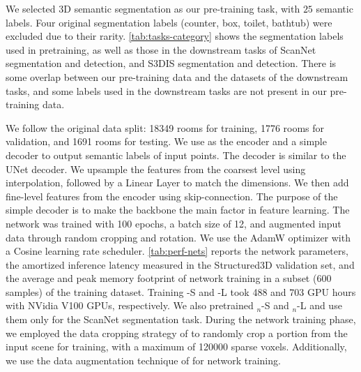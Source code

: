 \documentclass[10pt,twocolumn,letterpaper]{article}
\begin{document}
 We selected 3D semantic segmentation as our pre-training task, with $25$ semantic labels. Four original segmentation labels (counter, box, toilet, bathtub) were excluded due to their rarity. \cref{tab:tasks-category} shows the segmentation labels used in pretraining, as well as those in the downstream tasks of ScanNet segmentation and detection, and S3DIS segmentation and detection. There is some overlap between our pre-training data and the datasets of the downstream tasks, and some labels used in the downstream tasks are not present in our pre-training data.

We follow the original data split: 18349 rooms for training, 1776 rooms for validation, and 1691 rooms for testing. We use {\SST} as the encoder and a simple decoder to output semantic labels of input points. The decoder is similar to the UNet decoder. We upsample the features from the coarsest level using interpolation, followed by a Linear Layer to match the dimensions. We then add fine-level features from the encoder using skip-connection. The purpose of the simple decoder is to make the backbone the main factor in feature learning. The network was trained with 100 epochs, a batch size of 12, and augmented input data through random cropping and rotation. We use the AdamW optimizer with a Cosine learning rate scheduler. \cref{tab:perf-nets} reports the network parameters, the amortized inference latency measured in the Structured3D validation set, and the average and peak memory footprint of network training in a subset (600 samples) of the training dataset. Training \SST-S and \SST-L took 488 and 703 GPU hours with NVidia V100 GPUs, respectively. We also pretrained {\SST}$_n$-S and {\SST}$_n$-L and use them only for the ScanNet segmentation task.
 During the network training phase, we employed the data cropping strategy of \cite{lai2022stratified} to randomly crop a portion from the input scene for training, with a maximum of \num{120000} sparse voxels. Additionally, we use the data augmentation technique of \cite{lai2022stratified} for network training.
\end{document}
